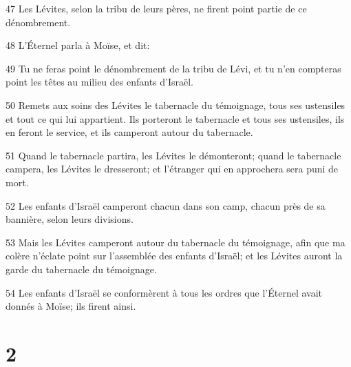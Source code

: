 \par 47 Les Lévites, selon la tribu de leurs pères, ne firent point partie de ce dénombrement.
\par 48 L'Éternel parla à Moïse, et dit:
\par 49 Tu ne feras point le dénombrement de la tribu de Lévi, et tu n'en compteras point les têtes au milieu des enfants d'Israël.
\par 50 Remets aux soins des Lévites le tabernacle du témoignage, tous ses ustensiles et tout ce qui lui appartient. Ils porteront le tabernacle et tous ses ustensiles, ils en feront le service, et ils camperont autour du tabernacle.
\par 51 Quand le tabernacle partira, les Lévites le démonteront; quand le tabernacle campera, les Lévites le dresseront; et l'étranger qui en approchera sera puni de mort.
\par 52 Les enfants d'Israël camperont chacun dans son camp, chacun près de sa bannière, selon leurs divisions.
\par 53 Mais les Lévites camperont autour du tabernacle du témoignage, afin que ma colère n'éclate point sur l'assemblée des enfants d'Israël; et les Lévites auront la garde du tabernacle du témoignage.
\par 54 Les enfants d'Israël se conformèrent à tous les ordres que l'Éternel avait donnés à Moïse; ils firent ainsi.

\chapter{2}

